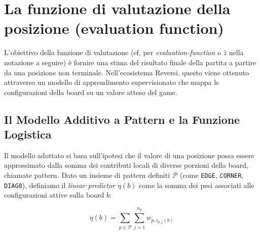 %
%
%
%
%
%
%


\section{La funzione di valutazione della posizione (evaluation function)}

L'obiettivo della funzione di valutazione (ef, per \textit{evaluation-function} o $\hat{z}$ nella notazione a seguire) è fornire una stima del
risultato finale della partita a partire da una posizione non terminale.
Nell'ecosistema Reversi, questo viene ottenuto attraverso un modello di apprendimento supervisionato che mappa le configurazioni della board
su un valore atteso del game.

\subsection{Il Modello Additivo a Pattern e la Funzione Logistica}

Il modello adottato si basa sull'ipotesi che il valore di una posizione possa essere approssimato dalla somma dei contributi locali di diverse porzioni della board,
chiamate pattern. Dato un insieme di pattern definiti $\mathcal{P}$ (come \texttt{EDGE}, \texttt{CORNER}, \texttt{DIAG8}),
definiamo il \textit{linear predictor} $\eta(b)$ come la somma dei pesi associati alle configurazioni attive sulla board $b$:

\begin{equation}
\eta(b) = \sum_{p \in \mathcal{P}} \sum_{j=1}^{n_p} w_{p, i_{p,j}(b)}
\end{equation}

